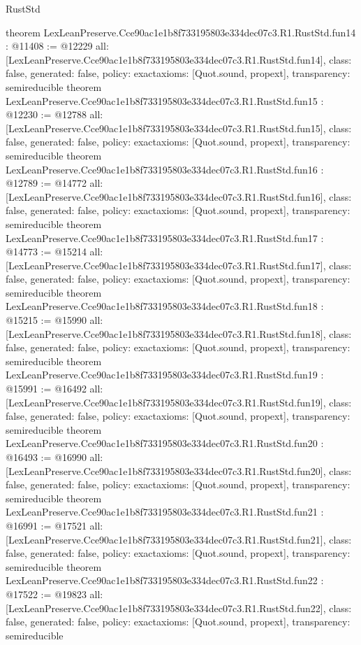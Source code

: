 \begin{lexlean}{RustStd}
\begin{coremodule}
{}
theorem LexLeanPreserve.Cce90ac1e1b8f733195803e334dec07c3.R1.RustStd.fun14 : @11408 := @12229 {
  all: [LexLeanPreserve.Cce90ac1e1b8f733195803e334dec07c3.R1.RustStd.fun14],
  class: false,
  generated: false,
  policy: exact{axioms: [Quot.sound, propext]},
  transparency: semireducible
}
theorem LexLeanPreserve.Cce90ac1e1b8f733195803e334dec07c3.R1.RustStd.fun15 : @12230 := @12788 {
  all: [LexLeanPreserve.Cce90ac1e1b8f733195803e334dec07c3.R1.RustStd.fun15],
  class: false,
  generated: false,
  policy: exact{axioms: [Quot.sound, propext]},
  transparency: semireducible
}
theorem LexLeanPreserve.Cce90ac1e1b8f733195803e334dec07c3.R1.RustStd.fun16 : @12789 := @14772 {
  all: [LexLeanPreserve.Cce90ac1e1b8f733195803e334dec07c3.R1.RustStd.fun16],
  class: false,
  generated: false,
  policy: exact{axioms: [Quot.sound, propext]},
  transparency: semireducible
}
theorem LexLeanPreserve.Cce90ac1e1b8f733195803e334dec07c3.R1.RustStd.fun17 : @14773 := @15214 {
  all: [LexLeanPreserve.Cce90ac1e1b8f733195803e334dec07c3.R1.RustStd.fun17],
  class: false,
  generated: false,
  policy: exact{axioms: [Quot.sound, propext]},
  transparency: semireducible
}
theorem LexLeanPreserve.Cce90ac1e1b8f733195803e334dec07c3.R1.RustStd.fun18 : @15215 := @15990 {
  all: [LexLeanPreserve.Cce90ac1e1b8f733195803e334dec07c3.R1.RustStd.fun18],
  class: false,
  generated: false,
  policy: exact{axioms: [Quot.sound, propext]},
  transparency: semireducible
}
theorem LexLeanPreserve.Cce90ac1e1b8f733195803e334dec07c3.R1.RustStd.fun19 : @15991 := @16492 {
  all: [LexLeanPreserve.Cce90ac1e1b8f733195803e334dec07c3.R1.RustStd.fun19],
  class: false,
  generated: false,
  policy: exact{axioms: [Quot.sound, propext]},
  transparency: semireducible
}
theorem LexLeanPreserve.Cce90ac1e1b8f733195803e334dec07c3.R1.RustStd.fun20 : @16493 := @16990 {
  all: [LexLeanPreserve.Cce90ac1e1b8f733195803e334dec07c3.R1.RustStd.fun20],
  class: false,
  generated: false,
  policy: exact{axioms: [Quot.sound, propext]},
  transparency: semireducible
}
theorem LexLeanPreserve.Cce90ac1e1b8f733195803e334dec07c3.R1.RustStd.fun21 : @16991 := @17521 {
  all: [LexLeanPreserve.Cce90ac1e1b8f733195803e334dec07c3.R1.RustStd.fun21],
  class: false,
  generated: false,
  policy: exact{axioms: [Quot.sound, propext]},
  transparency: semireducible
}
theorem LexLeanPreserve.Cce90ac1e1b8f733195803e334dec07c3.R1.RustStd.fun22 : @17522 := @19823 {
  all: [LexLeanPreserve.Cce90ac1e1b8f733195803e334dec07c3.R1.RustStd.fun22],
  class: false,
  generated: false,
  policy: exact{axioms: [Quot.sound, propext]},
  transparency: semireducible
}
\end{coremodule}
\end{lexlean}

